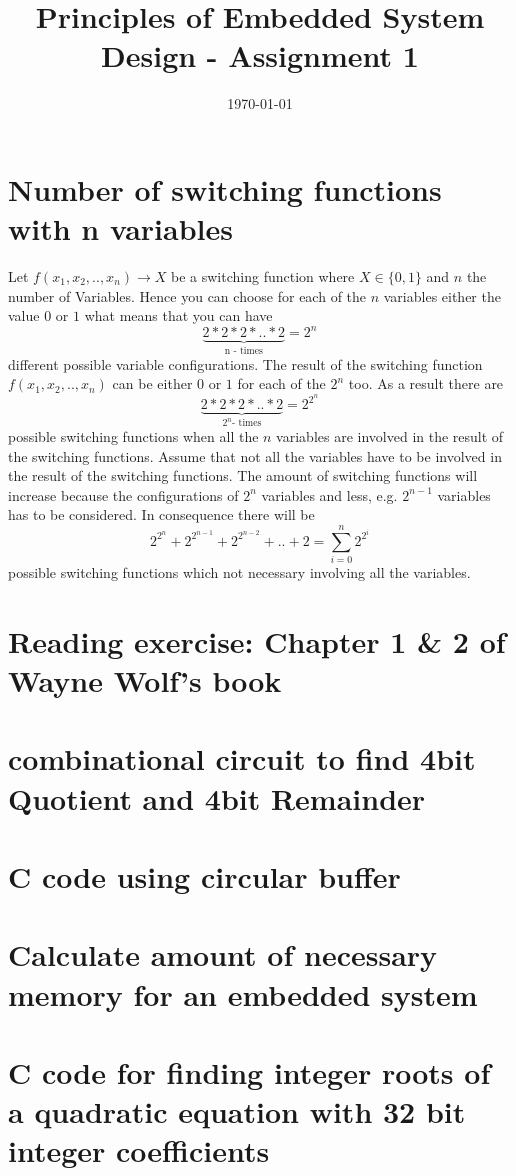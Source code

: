 \documentclass[a4paper,10pt]{scrartcl}
\title{Principles of Embedded System Design  - Assignment 1}
\author{\Authors}
\date{\today}
\begin{document}
\maketitle

\section{Number of switching functions with n variables}

Let  $ f(x_{1}, x_{2}, .. , x_{n}) \rightarrow X$ be a switching function where $X \in \{0,1\}$ and $n$ the number of Variables. Hence you can choose for each of the $n$ variables either the value $0$ or $1$ what means that you can have $$\underbrace{2*2*2* .. * 2}_\text{n - times}= 2^{n}$$ different possible variable configurations. The result of the switching function $ f(x_{1}, x_{2}, .. , x_{n})$ can be either $0$ or $1$ for each of the $2^{n}$ too. As a result there are $$\underbrace{2 * 2 * 2 * .. * 2}_{2^{n}\text{- times}} = 2 ^{2^{n}}$$ possible switching functions when all the $n$ variables are involved in the result of the switching functions. \newline \newline
Assume that not all the variables have to be involved in the result of the switching functions. The amount of switching functions will increase because the configurations of $2^{n}$ variables and less, e.g. $2^{n-1}$ variables has to be considered. In consequence there will be $$ 2 ^{2^{n}} + 2 ^{2^{n -1}} + 2 ^{2^{n -2}} + .. + 2 = \sum\limits_{i=0}^n 2 ^{2^{i}}$$ possible switching functions which not necessary involving all the variables.


\section{Reading exercise: Chapter 1 \& 2 of Wayne Wolf’s book}


\section{combinational circuit to find 4bit Quotient and 4bit Remainder}
\section{C code using circular buffer}
\section{Calculate amount of necessary memory for an embedded system}
\section{C code for finding integer roots of a quadratic equation with 32 bit integer coefficients}
\end{document}

